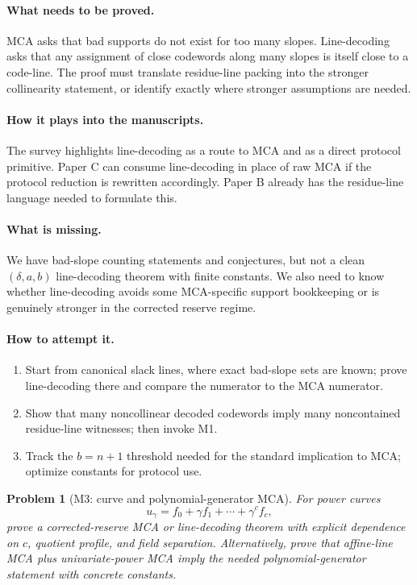 \documentclass[11pt]{article}
\newtheorem{problem}[theorem]{Problem}
\theoremstyle{definition}
\theoremstyle{remark}
\newcommand{\paperB}{Paper B}
\newcommand{\paperC}{Paper C}
\begin{document}
\paragraph{What needs to be proved.}  MCA asks that bad supports do not exist for too many slopes.  Line-decoding asks that any assignment of close codewords along many slopes is itself close to a code-line.  The proof must translate residue-line packing into the stronger collinearity statement, or identify exactly where stronger assumptions are needed.

\paragraph{How it plays into the manuscripts.}  The survey highlights line-decoding as a route to MCA and as a direct protocol primitive.  \paperC{} can consume line-decoding in place of raw MCA if the protocol reduction is rewritten accordingly.  \paperB{} already has the residue-line language needed to formulate this.

\paragraph{What is missing.}  We have bad-slope counting statements and conjectures, but not a clean $(\delta,a,b)$ line-decoding theorem with finite constants.  We also need to know whether line-decoding avoids some MCA-specific support bookkeeping or is genuinely stronger in the corrected reserve regime.

\paragraph{How to attempt it.}
\begin{enumerate}[leftmargin=2.2em]
\item Start from canonical slack lines, where exact bad-slope sets are known; prove line-decoding there and compare the numerator to the MCA numerator.
\item Show that many noncollinear decoded codewords imply many noncontained residue-line witnesses; then invoke M1.
\item Track the $b=n+1$ threshold needed for the standard implication to MCA; optimize constants for protocol use.
\end{enumerate}

\begin{problem}[M3: curve and polynomial-generator MCA]
\label{prob:M3}
For power curves
\[
        u_\gamma=f_0+\gamma f_1+\cdots+\gamma^c f_c,
\]
prove a corrected-reserve MCA or line-decoding theorem with explicit dependence on $c$, quotient profile, and field separation.  Alternatively, prove that affine-line MCA plus univariate-power MCA imply the needed polynomial-generator statement with concrete constants.
\end{problem}
\end{document}
